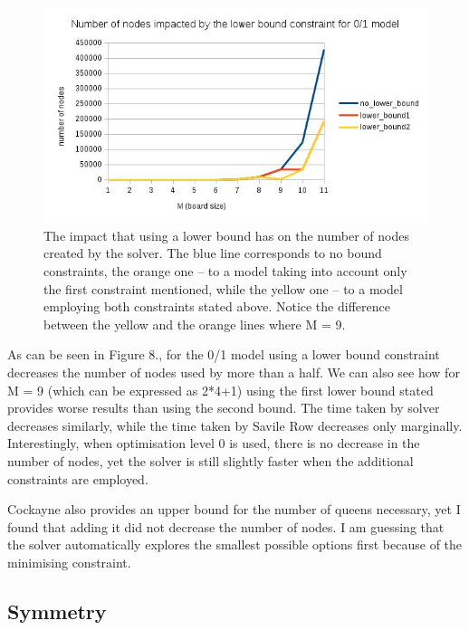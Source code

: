 \documentclass{report}
\begin{document}
\begin{figure} [\textwidth]
\includegraphics[scale=0.6]{images/p1_LB.jpg}
\caption{The impact that using a lower bound has on the number of nodes created by the solver. The blue line corresponds to no bound constraints, the orange one -- to a model taking into account only the first constraint mentioned, while the yellow one -- to a model employing both constraints stated above. Notice the difference between the yellow and the orange lines where M = 9.}
\end{figure}

As can be seen in Figure 8., for the 0/1 model using a lower bound constraint decreases the number of nodes used by more than a half. We can also see how for M = 9 (which can be expressed as 2*4+1) using the first lower bound stated provides worse results than using the second bound. The time taken by solver decreases similarly, while the time taken by Savile Row decreases only marginally. Interestingly, when optimisation level 0 is used, there is no decrease in the number of nodes, yet the solver is still slightly faster when the additional constraints are employed.

Cockayne \cite{EJC} also provides an upper bound for the number of queens necessary, yet I found that adding it did not decrease the number of nodes. I am guessing that the solver automatically explores the smallest possible options first because of the minimising constraint.

\subsection*{Symmetry}
\end{document}
